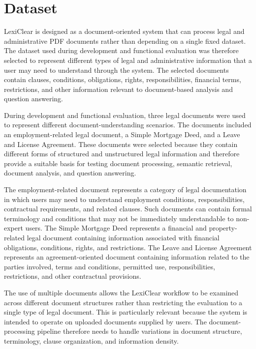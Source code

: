 \documentclass[12pt,a4paper,oneside]{report}
\begin{document}
\section{Dataset}

LexiClear is designed as a document-oriented system that can process legal and
administrative PDF documents rather than depending on a single fixed dataset.
The dataset used during development and functional evaluation was therefore
selected to represent different types of legal and administrative information
that a user may need to understand through the system. The selected documents
contain clauses, conditions, obligations, rights, responsibilities, financial
terms, restrictions, and other information relevant to document-based analysis
and question answering.

During development and functional evaluation, three legal documents were used
to represent different document-understanding scenarios. The documents
included an employment-related legal document, a Simple Mortgage Deed, and a
Leave and License Agreement. These documents were selected because they contain
different forms of structured and unstructured legal information and therefore
provide a suitable basis for testing document processing, semantic retrieval,
document analysis, and question answering.

The employment-related document represents a category of legal documentation
in which users may need to understand employment conditions, responsibilities,
contractual requirements, and related clauses. Such documents can contain
formal terminology and conditions that may not be immediately understandable
to non-expert users. The Simple Mortgage Deed represents a financial and
property-related legal document containing information associated with
financial obligations, conditions, rights, and restrictions. The Leave and
License Agreement represents an agreement-oriented document containing
information related to the parties involved, terms and conditions, permitted
use, responsibilities, restrictions, and other contractual provisions.

The use of multiple documents allows the LexiClear workflow to be examined
across different document structures rather than restricting the evaluation
to a single type of legal document. This is particularly relevant because the
system is intended to operate on uploaded documents supplied by users. The
document-processing pipeline therefore needs to handle variations in
document structure, terminology, clause organization, and information density.
\end{document}
